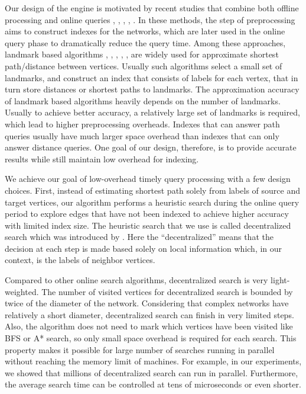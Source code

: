 Our design of the engine is motivated by recent studies that combine both offline processing and online queries \cite{Potamias:2009:FSP:1645953.1646063}, \cite{tretyakov2011fast}, \cite{Akiba:2012:SQC:2247596.2247614}, \cite{6399472}, \cite{Jin:2012:HLA:2213836.2213887}. In these methods, the step of preprocessing aims to construct indexes for the networks, which are later used in the online query phase to dramatically reduce the query time. Among these approaches, landmark based algorithms \cite{Thorup:2005:ADO:1044731.1044732}, \cite{Goldberg:2005:CSP:1070432.1070455}, \cite{Potamias:2009:FSP:1645953.1646063}, \cite{Gubichev:2010:FAE:1871437.1871503}, \cite{tretyakov2011fast}, \cite{6399472}are widely used for approximate shortest path/distance between vertices. Usually such algorithms select a small set of landmarks, and construct an index that consists of labels for each vertex, that in turn store distances or shortest paths to landmarks. The approximation accuracy of landmark based algorithms heavily depends on the number of landmarks. Usually to achieve better accuracy, a relatively large set of landmarks is required, which lead to higher preprocessing overheads. Indexes that can answer path queries usually have much larger space overhead than indexes that can only answer distance queries. One goal of our design, therefore, is to provide accurate results while still maintain low overhead for indexing.

We achieve our goal of low-overhead timely query processing with a few design choices. First, instead of estimating shortest path solely from labels of source and target vertices, our algorithm performs a heuristic search during the online query period to explore edges that have not been indexed to achieve higher accuracy with limited index size. The heuristic search that we use is called decentralized search which was introduced by \cite{Kleinberg:2000p5066}. Here the ``decentralized'' means that the decision at each step is made based solely on local information which, in our context, is the labels of neighbor vertices.

Compared to other online search algorithms, decentralized search is very light-weighted. The number of visited vertices for decentralized search is bounded by twice of the diameter of the network. Considering that complex networks have relatively a short diameter, decentralized search can finish in very limited steps. Also, the algorithm does not need to mark which vertices have been visited like BFS or A* search, so only small space overhead is required for each search. This property makes it possible for large number of searches running in parallel without reaching the memory limit of machines. For example, in our experiments, we showed that millions of decentralized search can run in parallel. Furthermore, the average search time can be controlled at tens of microseconds or even shorter. 

